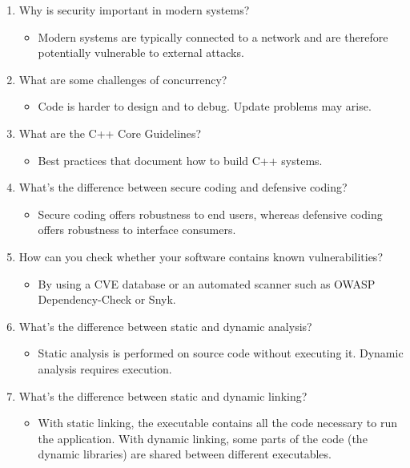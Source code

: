 \begin{enumerate}
\item
Why is security important in modern systems?
\begin{itemize}
\item 
Modern systems are typically connected to a network and are therefore potentially vulnerable to external attacks.
\end{itemize}

\item
What are some challenges of concurrency?
\begin{itemize}
\item 
Code is harder to design and to debug. Update problems may arise.
\end{itemize}

\item
What are the C++ Core Guidelines?
\begin{itemize}
\item 
Best practices that document how to build C++ systems.
\end{itemize}

\item
What's the difference between secure coding and defensive coding?
\begin{itemize}
\item 
Secure coding offers robustness to end users, whereas defensive coding offers robustness to interface consumers.
\end{itemize}

\item
How can you check whether your software contains known vulnerabilities?
\begin{itemize}
\item 
By using a CVE database or an automated scanner such as OWASP Dependency-Check or Snyk.
\end{itemize}

\item
What's the difference between static and dynamic analysis?
\begin{itemize}
\item 
Static analysis is performed on source code without executing it. Dynamic analysis requires execution.
\end{itemize}

\item
What's the difference between static and dynamic linking?
\begin{itemize}
\item 
With static linking, the executable contains all the code necessary to run the application. With dynamic linking, some parts of the code (the dynamic libraries) are shared between different executables.
\end{itemize}


\end{enumerate}
